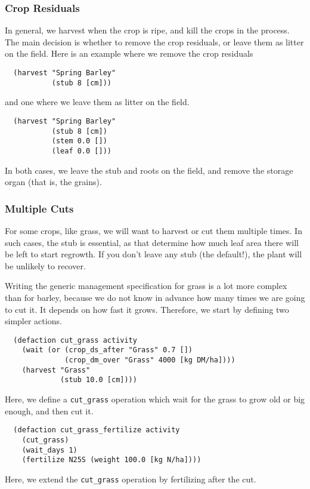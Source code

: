 \documentclass[a4paper,11pt]{article}
\begin{document}
\subsubsection{Crop Residuals}

In general, we harvest when the crop is ripe, and kill the crops in
the process. The main decision is whether to remove the crop
residuals, or leave them as litter on the field.  Here is an example
where we remove the crop residuals
\begin{verbatim}
  (harvest "Spring Barley"
           (stub 8 [cm]))
\end{verbatim}
and one where we leave them as litter on the field.
\begin{verbatim}
  (harvest "Spring Barley"
           (stub 8 [cm])
           (stem 0.0 [])
           (leaf 0.0 []))
\end{verbatim}
In both cases, we leave the stub and roots on the field, and remove
the storage organ (that is, the grains).

\subsubsection{Multiple Cuts}
\label{sec:cuts}

For some crops, like grass, we will want to harvest or cut them
multiple times.  In such cases, the stub is essential, as that
determine how much leaf area there will be left to start regrowth.  If
you don't leave any stub (the default!), the plant will be unlikely to
recover.

Writing the generic management specification for grass is a lot more
complex than for barley, because we do not know in advance how many
times we are going to cut it.  It depends on how fast it grows.
Therefore, we start by defining two simpler actions.
\begin{verbatim}
  (defaction cut_grass activity
    (wait (or (crop_ds_after "Grass" 0.7 [])
              (crop_dm_over "Grass" 4000 [kg DM/ha])))
    (harvest "Grass"
             (stub 10.0 [cm])))
\end{verbatim}
Here, we define a \texttt{cut\_grass} operation which wait for the
grass to grow old or big enough, and then cut it.

\begin{verbatim}
  (defaction cut_grass_fertilize activity
    (cut_grass)
    (wait_days 1)
    (fertilize N25S (weight 100.0 [kg N/ha])))
\end{verbatim}
Here, we extend the \texttt{cut\_grass} operation by fertilizing after
the cut.
\end{document}
